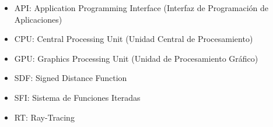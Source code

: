 \begin{itemize}
\item API: Application Programming Interface (Interfaz de Programación de Aplicaciones)
\item CPU: Central Processing Unit (Unidad Central de Procesamiento)
\item GPU: Graphics Processing Unit (Unidad de Procesamiento Gráfico)
\item SDF: Signed Distance Function
\item SFI: Sistema de Funciones Iteradas
\item RT: Ray-Tracing
\end{itemize}